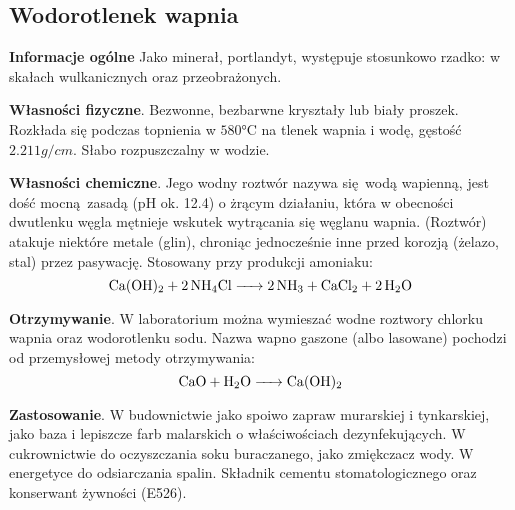 \subsection{Wodorotlenek wapnia }
\textbf{Informacje ogólne}
Jako minerał, portlandyt, występuje stosunkowo rzadko: w skałach wulkanicznych oraz przeobrażonych.

\textbf{Własności fizyczne}.
Bezwonne, bezbarwne kryształy lub biały proszek.
Rozkłada się podczas topnienia w $580 \si{\celsius}$ na tlenek wapnia i wodę, gęstość $2.211 \si{g \per cm}$.
Słabo rozpuszczalny w wodzie.

\textbf{Własności chemiczne}.
Jego wodny roztwór nazywa się wodą wapienną, jest dość mocną zasadą (pH ok. 12.4) o żrącym działaniu, która w obecności dwutlenku węgla mętnieje wskutek wytrącania się węglanu wapnia.
(Roztwór) atakuje niektóre metale (glin), chroniąc jednocześnie inne przed korozją (żelazo, stal) przez pasywację.
Stosowany przy produkcji amoniaku: $$\ce{Ca(OH)2 + 2NH4Cl ->  2NH3 + CaCl2 + 2H2O}$$

\textbf{Otrzymywanie}.
W laboratorium można wymieszać wodne roztwory chlorku wapnia oraz wodorotlenku sodu.
Nazwa wapno gaszone (albo lasowane) pochodzi od przemysłowej metody otrzymywania: $$\ce{CaO + H2O -> Ca(OH)2}$$

\textbf{Zastosowanie}.
W budownictwie jako spoiwo zapraw murarskiej i tynkarskiej, jako baza i lepiszcze farb malarskich o właściwościach dezynfekujących.
W cukrownictwie do oczyszczania soku buraczanego, jako zmiękczacz wody.
W energetyce do odsiarczania spalin.
Składnik cementu stomatologicznego oraz konserwant żywności (E526).

